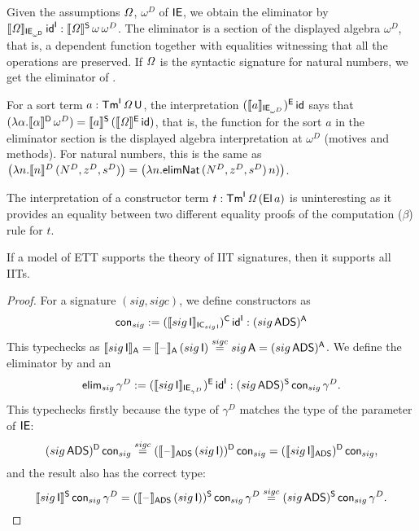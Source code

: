 \documentclass[a4paper,UKenglish,cleveref, autoref]{lipics-v2019}
\begin{document}
\begin{example}
  Given the assumptions $\mathit{\Omega}$, $\omega^D$ of $\mathsf{IE}$, we obtain the
  eliminator by
  $\llbracket\mathit{\Omega}\rrbracket_{\mathsf{IE}_{\omega^{\mathsf{D}}}}\,\mathsf{id}^{\mathsf{I}} :
  \llbracket\mathit{\Omega}\rrbracket^{\mathsf{S}}\,\omega\,\omega^D$. The eliminator is a section of
  the displayed algebra $\omega^D$, that is, a dependent function
  together with equalities witnessing that all the operations are
  preserved. If $\mathit{\Omega}$ is the syntactic signature for natural
  numbers, we get the eliminator of .

  For a sort term $a:\mathsf{Tm}^{\mathsf{I}}\,\mathit{\Omega}\,\mathsf{U}$, the interpretation
  $(\llbracket a\rrbracket_{\mathsf{IE}_{\omega^D}})^{\mathsf{E}}\,\mathsf{id}$ says that
  $(\lambda\alpha.\llbracket\alpha\rrbracket^{\mathsf{D}}\,\omega^D) = \llbracket
  a\rrbracket^{\mathsf{S}}\,(\llbracket\mathit{\Omega}\rrbracket^{\mathsf{E}}\,\mathsf{id})$, that is, the function for the sort
  $a$ in the eliminator section is the displayed algebra
  interpretation at $\omega^D$ (motives and methods). For natural
  numbers, this is the same as
  $\big(\lambda n.\llbracket n\rrbracket^D\,(N^D,z^D,s^D)\big) = \big(\lambda
  n.\mathsf{elimNat}\,(N^D,z^D,s^D)\,n)\big)$.

  The interpretation of a constructor term
  $t:\mathsf{Tm}^{\mathsf{I}}\,\mathit{\Omega}\,(\mathsf{El}\,a)$ is uninteresting as it provides an
  equality between two different equality proofs of the computation
  ($\beta$) rule for $t$.
\end{example}

\begin{theorem}\label{thm:ToSToIITs}
  If a model of ETT supports the theory of IIT signatures,
  then it supports all IITs.
\end{theorem}
\begin{proof}
  For a signature $({sig},{sigc})$, we define constructors as
  \[
    \mathsf{con}_{sig}:= (\llbracket{sig}\,\mathsf{I}\rrbracket_{\mathsf{IC}_{{sig}\,\mathsf{I}}})^{\mathsf{C}}\,\mathsf{id}^{\mathsf{I}} : ({sig}\,\mathsf{ADS})^{\mathsf{A}}
  \]
  This typechecks as
  $\llbracket{sig}\,\mathsf{I}\rrbracket_{\mathsf{A}} = \llbracket\mathord{\hspace{1pt}\text{--}\hspace{1pt}}\rrbracket_{\mathsf{A}}\,({sig}\,\mathsf{I})
  \overset{{sigc}}{=} {{sig}\,\mathsf{A}} = ({sig}\,\mathsf{ADS})^{\mathsf{A}}$. We define the
  eliminator by
  and an
  \[
    \mathsf{elim}_{sig}\,\gamma^D := (\llbracket{sig}\,\mathsf{I}\rrbracket_{\mathsf{IE}_{\gamma^D}})^{\mathsf{E}}\,\mathsf{id}^{\mathsf{I}}  : ({sig}\,\mathsf{ADS})^{\mathsf{S}}\,\mathsf{con}_{sig}\,\gamma^D.
  \]
  This typechecks firstly because the type of $\gamma^D$ matches the
  type of the parameter of $\mathsf{IE}$:
  \[
    ({sig}\,\mathsf{ADS})^{\mathsf{D}}\,\mathsf{con}_{sig} \overset{{sigc}}{=}
    (\llbracket\mathord{\hspace{1pt}\text{--}\hspace{1pt}}\rrbracket_{\mathsf{ADS}}\,({sig}\,\mathsf{I}))^{\mathsf{D}}\,\mathsf{con}_{sig} =
    (\llbracket{sig}\,\mathsf{I}\rrbracket_{\mathsf{ADS}})^{\mathsf{D}}\,\mathsf{con}_{sig},
  \]
  and the result also has the correct type:
  \[
    \llbracket{sig}\,\mathsf{I}\rrbracket^{\mathsf{S}}\,\mathsf{con}_{sig}\,\gamma^D = (\llbracket\mathord{\hspace{1pt}\text{--}\hspace{1pt}}\rrbracket_{\mathsf{ADS}}\,({sig}\,\mathsf{I}))^{\mathsf{S}}\,\mathsf{con}_{sig}\,\gamma^D \overset{{sigc}}{=} ({sig}\,\mathsf{ADS})^{\mathsf{S}}\,\mathsf{con}_{sig}\,\gamma^D.
  \]
\end{proof}
\end{document}

